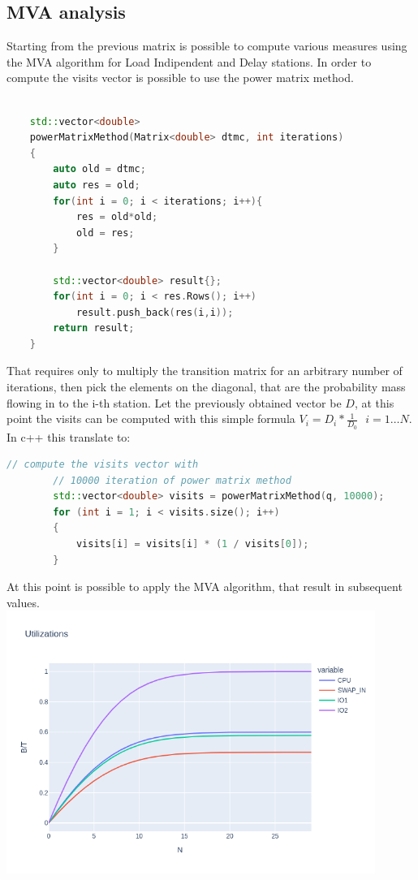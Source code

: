 \documentclass[12pt,a4paper]{article}
\begin{document}
    \subsection{MVA analysis}
    Starting from the previous matrix is possible to compute various measures using the MVA algorithm for Load Indipendent and Delay stations. In order to compute the visits vector is possible to use the power matrix method.
    \begin{lstlisting}[language=C++]
        
    std::vector<double> 
    powerMatrixMethod(Matrix<double> dtmc, int iterations)
    {
        auto old = dtmc;
        auto res = old;
        for(int i = 0; i < iterations; i++){
            res = old*old;
            old = res;
        }

        std::vector<double> result{};
        for(int i = 0; i < res.Rows(); i++)
            result.push_back(res(i,i));
        return result;
    }
    \end{lstlisting}
    That requires only to multiply the transition matrix for an arbitrary number of iterations, then pick the elements on the diagonal, that are the probability mass flowing in to the i-th station. Let the previously obtained vector be $D$, at this point the visits can be computed with this simple formula $V_i=D_i*\frac{1}{D_0} \ \ \ i=1 \dots N$. In c++ this translate to:
    \begin{lstlisting}[language=C++]
        // compute the visits vector with 
        // 10000 iteration of power matrix method
        std::vector<double> visits = powerMatrixMethod(q, 10000);
        for (int i = 1; i < visits.size(); i++)
        {
            visits[i] = visits[i] * (1 / visits[0]);
        }
    \end{lstlisting}
    At this point is possible to apply the MVA algorithm, that result in subsequent values.
    \\
    \includegraphics[width=0.9\textwidth]{Images/Utilizations.png}\\
\end{document}
